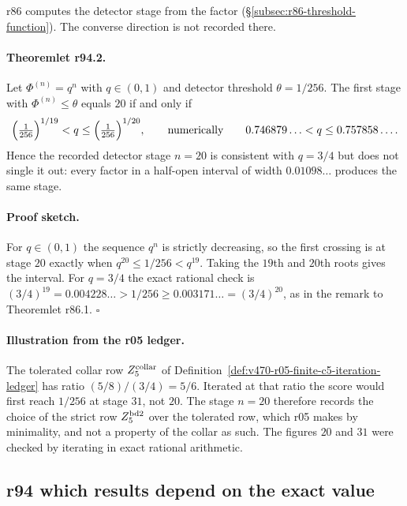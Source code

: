 r86 computes the detector stage from the factor
(\S\ref{subsec:r86-threshold-function}).  The converse direction is not recorded there.

\paragraph{Theoremlet r94.2.}
Let \(\Phi^{(n)}=q^n\) with \(q\in(0,1)\) and detector threshold \(\theta=1/256\).  The first
stage with \(\Phi^{(n)}\le\theta\) equals \(20\) if and only if
\[
\Bigl(\tfrac1{256}\Bigr)^{1/19}<q\le\Bigl(\tfrac1{256}\Bigr)^{1/20},
\qquad\text{numerically}\qquad
0.746879\ldots<q\le0.757858\ldots .
\]
Hence the recorded detector stage \(n=20\) is consistent with \(q=3/4\) but does not single it
out: every factor in a half-open interval of width \(0.01098\ldots\) produces the same stage.

\paragraph{Proof sketch.}
For \(q\in(0,1)\) the sequence \(q^n\) is strictly decreasing, so the first crossing is at
stage \(20\) exactly when \(q^{20}\le1/256<q^{19}\).  Taking the \(19\)th and \(20\)th roots gives
the interval.  For \(q=3/4\) the exact rational check is
\((3/4)^{19}=0.004228\ldots>1/256\ge0.003171\ldots=(3/4)^{20}\), as in the remark to
Theoremlet r86.1.  \(\square\)

\paragraph{Illustration from the r05 ledger.}
The tolerated collar row \(Z_5^{\rm collar}\) of
Definition~\ref{def:v470-r05-finite-c5-iteration-ledger} has ratio \((5/8)/(3/4)=5/6\).  Iterated
at that ratio the score would first reach \(1/256\) at stage \(31\), not \(20\).  The stage
\(n=20\) therefore records the choice of the strict row \(Z_5^{\rm bd2}\) over the tolerated row,
which r05 makes by minimality, and not a property of the collar as such.  The figures \(20\)
and \(31\) were checked by iterating in exact rational arithmetic.

\subsection*{r94 which results depend on the exact value}
\label{subsec:r94-value-dependence}

